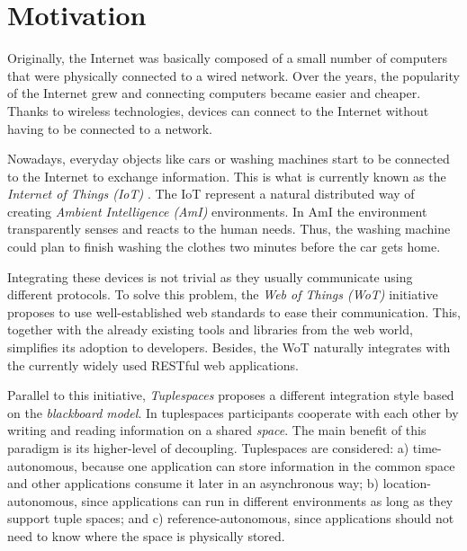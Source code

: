 


\section{Motivation}
\label{sec:Motivation}


Originally, the Internet was basically composed of a small number of computers that were physically connected to a wired network.
Over the years, the popularity of the Internet grew and connecting computers became easier and cheaper.
Thanks to wireless technologies, devices can connect to the Internet without having to be connected to a network.

Nowadays, everyday objects like cars or washing machines start to be connected to the Internet to exchange information.
This is what is currently known as the \emph{Internet of Things (IoT)} \citep{atzori_internet_2010}.
The IoT represent a natural distributed way of creating \emph{Ambient Intelligence (AmI)} environments.
In AmI the environment transparently senses and reacts to the human needs. %
Thus, the washing machine could plan to finish washing the clothes two minutes before the car gets home.

\medskip

Integrating these devices is not trivial as they usually communicate using different protocols.
To solve this problem, the \emph{Web of Things (WoT)} initiative proposes to use well-established web standards to ease their communication. %
This, together with the already existing tools and libraries from the web world, simplifies its adoption to developers. %
Besides, the WoT naturally integrates with the currently widely used RESTful web applications.

Parallel to this initiative, \emph{Tuplespaces} proposes a different integration style based on the \emph{blackboard model}. %
In tuplespaces participants cooperate with each other by writing and reading information on a shared \emph{space}.
The main benefit of this paradigm is its higher-level of decoupling.
Tuplespaces are considered:
a) time-autonomous, because one application can store information in the common space and other applications consume it later in an asynchronous way;
b) location-autonomous, since applications can run in different environments as long as they support tuple spaces;
and c) reference-autonomous, since applications should not need to know where the space is physically stored.

